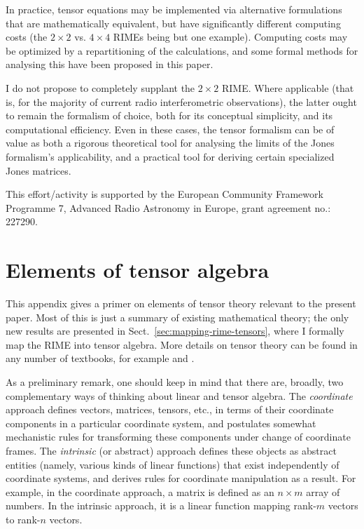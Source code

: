 \documentclass[]{aa}
\begin{document}
In practice, tensor equations may be implemented via alternative formulations that are mathematically equivalent, but have significantly different 
computing costs (the $2\times2$ vs. $4\times4$ RIMEs being but one example). Computing costs may be optimized by a repartitioning of the calculations, and some formal methods for analysing this have been proposed in this paper.

I do not propose to completely supplant the $2\times2$ RIME. Where applicable (that is, for the majority of current radio interferometric observations), the latter ought to remain the formalism of choice, both for its conceptual simplicity, and its computational efficiency. Even in these cases, the tensor formalism can be of value as both a rigorous theoretical tool for analysing the limits of the Jones formalism's applicability, and a practical tool for deriving certain specialized Jones matrices. 

\begin{acknowledgements}

This effort/activity is supported by the European Community Framework Programme 7, Advanced Radio Astronomy in Europe, grant agreement no.: 227290.

\end{acknowledgements}

\appendix

\section{Elements of tensor algebra}
\label{sec:tensor-theory}

This appendix gives a primer on elements of tensor theory relevant to the present paper. Most of this is just a summary of existing mathematical theory; the only new results are presented in Sect.~\ref{sec:mapping-rime-tensors}, where I formally map the RIME into tensor algebra. More details on tensor theory can be found in any number of textbooks, for example \citet{synge-schild-tensor} and \citet{simmonds-tensor-analysis}. 

As a preliminary remark, one should keep in mind that there are, broadly, two complementary ways of thinking about linear and tensor algebra. The \emph{coordinate} approach defines vectors, matrices, tensors, etc., in terms of their coordinate components in a particular coordinate system, and postulates somewhat mechanistic rules for transforming these components under change of coordinate frames. The \emph{intrinsic} (or abstract) approach defines these objects as abstract entities (namely, various kinds of linear functions) that exist independently of coordinate systems, and derives rules for coordinate manipulation as a result. For example, in the coordinate approach, a matrix is defined as an $n\times m$ array of numbers. In the intrinsic approach, it is a linear function mapping rank-$m$ vectors to rank-$n$ vectors.
\end{document}
